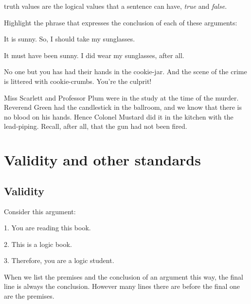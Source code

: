\begin{factboxy}{truth values}
 are the logical values that a sentence can have, \textit{true} and \textit{false}.
\end{factboxy}

\practiceproblems

\noindent Highlight the phrase that expresses the conclusion of each of these arguments:
\begin{earg}
	\item It is sunny. So, I should take my sunglasses.
	\item It must have been sunny. I did wear my sunglasses, after all.
	\item No one but you has had their hands in the cookie-jar. And the scene of the crime is littered with cookie-crumbs. You're the culprit!
	\item Miss Scarlett and Professor Plum were in the study at the time of the murder. Reverend Green had the candlestick in the ballroom, and we know that there is no blood on his hands. Hence Colonel Mustard did it in the kitchen with the lead-piping. Recall, after all, that the gun had not been fired.
\end{earg}




\chapter{Validity and other standards}\label{s:Valid}

\section{Validity}\label{s:Valid-def}

Consider this argument:
	\begin{earg}
		\item[1.] You are reading this book.
		\item[2.] This is a logic book.
		\item[3.] Therefore, you are a logic student.
	\end{earg}

\begin{notebox}
When we list the premises and the conclusion of an argument this way, the final line is always the conclusion. However many lines there are before the final one are the premises.
\end{notebox}

